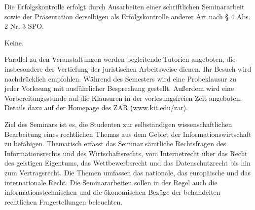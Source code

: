\begin{course}

\setdoclanguagegerman
{}



\coursehead


\label{cour_4421.dp_997}


\begin{styleenv}
\begin{assessment}
Die Erfolgskontrolle erfolgt durch Ausarbeiten einer schriftlichen Seminararbeit sowie der Präsentation derselbigen als Erfolgskontrolle anderer Art nach § 4 Abs. 2 Nr. 3 SPO.


\end{assessment}

\begin{conditions}Keine.\end{conditions}

\begin{recommendations}Parallel zu den Veranstaltungen werden begleitende Tutorien angeboten, die insbesondere der Vertiefung der juristischen Arbeitsweise dienen. Ihr Besuch wird nachdrücklich empfohlen.\newline
Während des Semesters wird eine Probeklausur zu jeder Vorlesung mit ausführlicher Besprechung gestellt. Außerdem wird eine Vorbereitungsstunde auf die Klausuren in der vorlesungsfreien Zeit angeboten.\newline
Details dazu auf der Homepage des ZAR (www.kit.edu/zar).

\end{recommendations}
\end{styleenv}

\begin{learningoutcomes}
Ziel des Seminars ist es, die Studenten zur selbständigen wissenschaftlichen Bearbeitung eines rechtlichen Themas aus dem Gebiet der Informationswirtschaft zu befähigen. Thematisch erfasst das Seminar sämtliche Rechtsfragen des Informationsrechts und des Wirtschaftsrechts, vom Internetrecht über das Recht des geistigen Eigentums, das Wettbewerbsrecht und das Datenschutzrecht bis hin zum Vertragsrecht. Die Themen umfassen das nationale, das europäische und das internationale Recht. Die Seminararbeiten sollen in der Regel auch die informationstechnischen und die ökonomischen Bezüge der behandelten rechtlichen Fragestellungen beleuchten.



\end{learningoutcomes}
\end{course}

